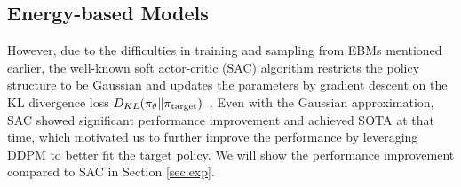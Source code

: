 \subsection{Energy-based Models}

However, due to the difficulties in training and sampling from EBMs mentioned earlier, the well-known soft actor-critic (SAC) algorithm restricts the policy structure to be Gaussian and updates the parameters by gradient descent on the KL divergence loss $D_{KL}(\pi_\theta\|\pi_{\rm target})$~\cite{haarnoja2018soft}. Even with the Gaussian approximation, SAC showed significant performance improvement and achieved SOTA at that time, which motivated us to further improve the performance by leveraging DDPM to better fit the target policy. We will show the performance improvement compared to SAC in Section \ref{sec:exp}. 

